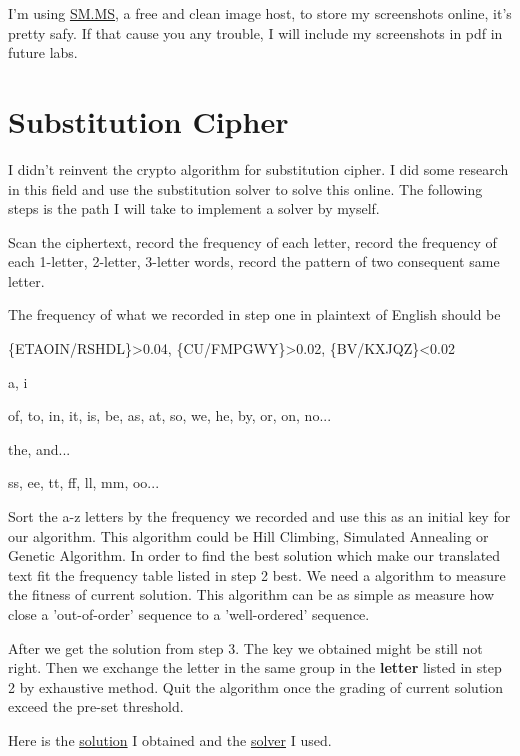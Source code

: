 \documentclass{article}
\begin{document}
\maketitle
I'm using \href{https://sm.ms/}{SM.MS}, a free and clean image host, to store my screenshots online, it's pretty safy. If that cause you any trouble, I will include my screenshots in pdf in future labs.
\section{Substitution Cipher}
I didn't reinvent the crypto algorithm for substitution cipher. I did some research in this field and use the substitution solver to solve this online. The following steps is the path I will take to implement a solver by myself.
\begin{tlist}{3}
	\item[1.]
	Scan the ciphertext, record the frequency of each letter, record the frequency of each 1-letter, 2-letter, 3-letter words, record the pattern of two consequent same letter.
	\item[2.]
	The frequency of what we recorded in step one in plaintext of English should be
	\begin{tlist}{0}
		\item[letter:]\{ETAOIN/RSHDL\}>0.04, \{CU/FMPGWY\}>0.02, \{BV/KXJQZ\}<0.02
		\item[1-letter word:]a, i
		\item[2-letter word:]of, to, in, it, is, be, as, at, so, we, he, by, or, on, no...
		\item[3-letter word:]the, and...
		\item[consequent pattern:]ss, ee, tt, ff, ll, mm, oo...
	\end{tlist}
	\item[3.]
	Sort the a-z letters by the frequency we recorded and use this as an initial key for our algorithm. This algorithm could be Hill Climbing, Simulated Annealing or Genetic Algorithm. In order to find the best solution which make our translated text fit the frequency table listed in step 2 best. We need a algorithm to measure the fitness of current solution. This algorithm can be as simple as measure how close a 'out-of-order' sequence to a 'well-ordered' sequence.
	\item[4.]
	After we get the solution from step 3. The key we obtained might be still not right. Then we exchange the letter in the same group in the \textbf{letter} listed in step 2 by exhaustive method. Quit the algorithm once the grading of current solution exceed the pre-set threshold.
\end{tlist}
Here is the \href{http://freetexthost.com/j54kutb05a}{solution} I obtained and the \href{https://www.guballa.de/substitution-solver}{solver} I used.
\end{document}
